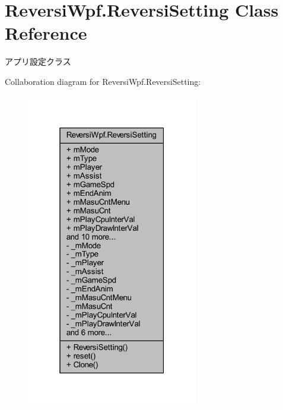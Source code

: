 \hypertarget{class_reversi_wpf_1_1_reversi_setting}{}\section{Reversi\+Wpf.\+Reversi\+Setting Class Reference}
\label{class_reversi_wpf_1_1_reversi_setting}


アプリ設定クラス  




Collaboration diagram for Reversi\+Wpf.\+Reversi\+Setting\+:
\nopagebreak
\begin{figure}[H]
\begin{center}
\leavevmode
\includegraphics[width=211pt]{class_reversi_wpf_1_1_reversi_setting__coll__graph}
\end{center}
\end{figure}

